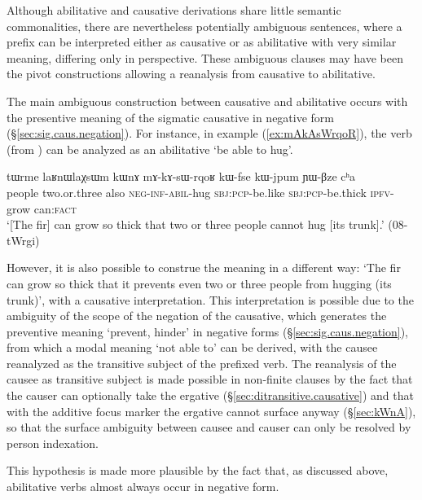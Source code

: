 Although abilitative and causative derivations share little semantic commonalities, there are nevertheless potentially ambiguous sentences, where a  prefix can be interpreted either as causative or as abilitative with very similar meaning, differing only in perspective. These ambiguous clauses may have been the pivot constructions allowing a reanalysis from causative to abilitative.

The main ambiguous construction between causative and abilitative occurs with the presentive meaning of the sigmatic causative in negative form (§\ref{sec:sig.caus.negation}). For instance, in example (\ref{ex:mAkAsWrqoR}), the verb  (from ) can be analyzed as an abilitative `be able to hug'.


 \begin{exe}
\ex \label{ex:mAkAsWrqoR}
\gll tɯrme laʁnɯlaχsɯm kɯnɤ mɤ-kɤ-sɯ-rqoʁ kɯ-fse kɯ-jpum ɲɯ-βze cʰa  \\
people two.or.three also \textsc{neg}-\textsc{inf}-\textsc{abil}-hug \textsc{sbj}:\textsc{pcp}-be.like \textsc{sbj}:\textsc{pcp}-be.thick \textsc{ipfv}-grow can\textsc{:fact} \\
\glt  `[The fir] can grow so thick that two or three people cannot hug [its trunk].' (08-tWrgi)
   \end{exe}

However, it is also possible to construe the meaning in a different way: `The fir can grow so thick that it prevents even two or three people from hugging (its trunk)', with a causative interpretation. This interpretation is possible due to the ambiguity of the scope of the negation of the causative, which generates the preventive meaning `prevent, hinder' in negative forms (§\ref{sec:sig.caus.negation}), from which a modal meaning `not able to' can be derived, with the causee reanalyzed as the transitive subject of the  prefixed verb. The reanalysis of the causee as transitive subject is made possible in non-finite clauses by the fact that the causer can optionally take the ergative (§\ref{sec:ditransitive.causative}) and that with the additive focus marker  the ergative cannot surface anyway (§\ref{sec:kWnA}), so that the surface ambiguity between causee and causer can only be resolved by person indexation. 

This hypothesis is made more plausible by the fact that, as discussed above, abilitative verbs almost always occur in negative form.

